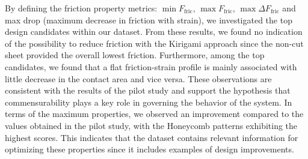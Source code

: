 By defining the friction property metrics: $\min F_{\text{fric}}$, $\max
F_{\text{fric}}$, $\max \Delta F_{\text{fric}}$ and max drop (maximum decrease
in friction with strain), we investigated the top design candidates within our
dataset. From these results, we found no indication of the possibility to
reduce friction with the Kirigami approach since the non-cut sheet provided the
overall lowest friction. Furthermore, among the top candidates, we found that a
flat friction-strain profile is mainly associated with little decrease in the
contact area and vice versa. These observations are consistent with the results
of the pilot study and support the hypothesis that commensurability plays a key
role in governing the behavior of the system. In terms of the maximum
properties, we observed an improvement compared to the values obtained in the
pilot study, with the Honeycomb patterns exhibiting the highest scores. This
indicates that the dataset contains relevant information for optimizing these properties since it includes examples of design improvements.

